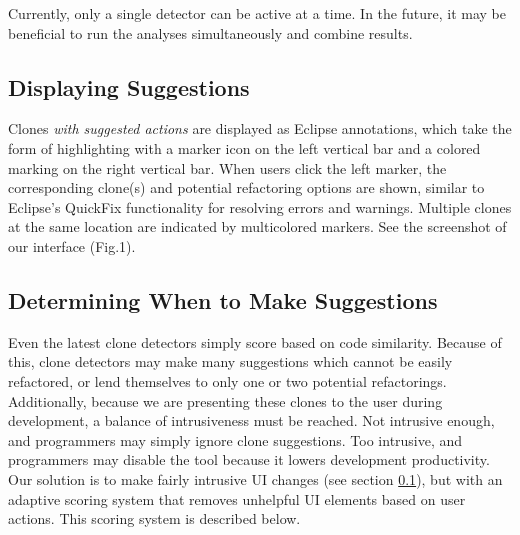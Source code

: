 \documentclass[preprint,10pt]{sigplanconf}
\begin{document}


Currently, only a single detector can be active at a time. In the
future, it may be beneficial to run the analyses simultaneously and
combine results.

\subsection{Displaying Suggestions}
\label{sec:display}
Clones \emph{with suggested actions} are displayed as Eclipse annotations,
which take 
the form of highlighting with a marker icon on the left vertical bar and a 
colored marking on the right vertical bar.  When users click the left marker,
the corresponding clone(s) and potential refactoring options are shown,
similar to Eclipse's QuickFix functionality for resolving errors and warnings.
Multiple clones at the same location are indicated by multicolored markers.
See the screenshot of our interface (Fig.1).

\subsection{Determining When to Make Suggestions}

Even the latest clone detectors simply score based on code similarity. 
Because of this, clone detectors may make many suggestions which 
cannot be easily refactored, or lend themselves to only one or two 
potential refactorings.  Additionally, because we are presenting these
clones to the user during development, a balance of intrusiveness must 
be reached. Not intrusive enough, and programmers may simply ignore 
clone suggestions.  Too intrusive, and programmers may disable the 
tool because it lowers development productivity.  Our solution is to make
fairly intrusive UI changes (see section \ref{sec:display}), but with an 
adaptive scoring system that removes unhelpful UI elements based
on user actions.  This  scoring system is described below.
\end{document}
